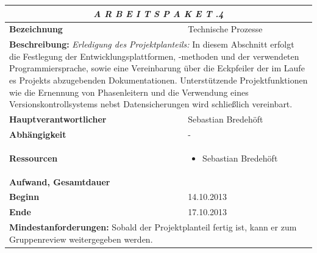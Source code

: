 \documentclass[fontsize=12pt,paper=a4,twoside]{scrartcl}
\begin{document}
\begin{tabular}{p{7.5cm}|p{7.5cm}}\toprule
\multicolumn{2}{c}{\textbf{\textit{A R B E I T S P A K E T \quad 1.1.4}}} \\ \toprule \hline
\textbf{Bezeichnung} & Technische Prozesse\\\hline
\multicolumn{2}{p{15cm}}{\textbf{Beschreibung:} \newline 
\textit{Erledigung des Projektplanteils:} In diesem Abschnitt erfolgt die Festlegung der Entwicklungsplattformen, -methoden und der verwendeten Programmiersprache, sowie eine Vereinbarung über die Eckpfeiler der im Laufe es Projekts abzugebenden Dokumentationen. Unterstützende Projektfunktionen wie die Ernennung von Phasenleitern und die Verwendung eines Versionskontrollsystems nebst Datensicherungen wird schließlich vereinbart. }  \\\hline
\textbf{Hauptverantwortlicher} & Sebastian Bredehöft \\\hline
\textbf{Abhängigkeit} & -\\\hline
\textbf{Ressourcen} & \begin{itemize}
\itemsep0pt
\item Sebastian Bredehöft
\end{itemize} \\\hline
\textbf{Aufwand, Gesamtdauer} & \\\hline
\textbf{Beginn} & 14.10.2013 \\\hline
\textbf{Ende} & 17.10.2013\\\hline
\multicolumn{2}{p{15cm}}{\textbf{Mindestanforderungen: } \newline
Sobald der Projektplanteil fertig ist, kann er zum Gruppenreview weitergegeben werden. }  \\ \toprule
\end{tabular} \\\\
\end{document}
